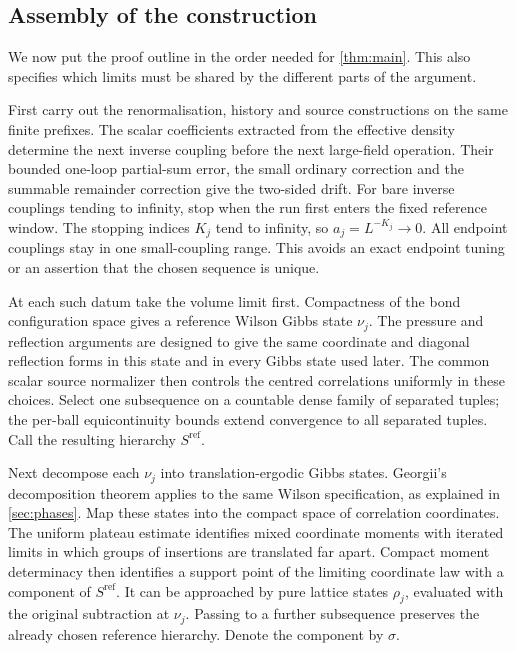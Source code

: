 \documentclass[11pt,letterpaper,reqno]{amsart}
\theoremstyle{definition}
\theoremstyle{remark}
\begin{document}
\subsection{Assembly of the construction}\label{sec:assembly}

We now put the proof outline in the order needed for
\cref{thm:main}. This also specifies which limits must be shared
by the different parts of the argument.

First carry out the renormalisation, history and source constructions
on the same finite prefixes. The scalar coefficients extracted from
the effective density determine the next inverse coupling before the
next large-field operation. Their bounded one-loop partial-sum error,
the small ordinary correction and the summable remainder correction
give the two-sided drift. For bare inverse couplings tending to
infinity, stop when the run first enters the fixed reference window.
The stopping indices $K_j$ tend to infinity, so $a_j=L^{-K_j}\to0$.
All endpoint couplings stay in one small-coupling range. This avoids
an exact endpoint tuning or an assertion that the chosen sequence is
unique.

At each such datum take the volume limit first. Compactness of the
bond configuration space gives a reference Wilson Gibbs state $\nu_j$.
The pressure and reflection arguments are designed to give the same
coordinate and diagonal reflection forms in this state and in every
Gibbs state used later. The common scalar source normalizer then
controls the centred correlations uniformly in these choices. Select
one subsequence on a countable dense family of separated tuples;
the per-ball equicontinuity bounds extend convergence to all separated
tuples. Call the resulting hierarchy $S^{\mathrm{ref}}$.

Next decompose each $\nu_j$ into translation-ergodic Gibbs states.
Georgii's decomposition theorem applies to the same Wilson
specification, as explained in \cref{sec:phases}. Map these states
into the compact space of correlation coordinates. The uniform
plateau estimate identifies mixed coordinate moments with iterated
limits in which groups of insertions are translated far apart.
Compact moment determinacy then identifies a support point of the
limiting coordinate law with a component of $S^{\mathrm{ref}}$.
It can be approached by pure lattice states $\rho_j$, evaluated with
the original subtraction at $\nu_j$. Passing to a further subsequence
preserves the already chosen reference hierarchy. Denote the
component by $\sigma$.
\end{document}
